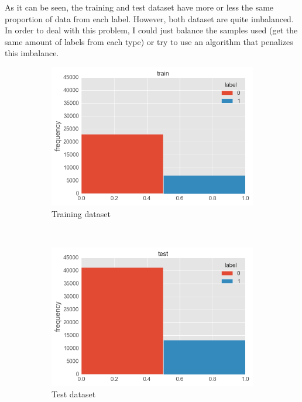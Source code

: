 \documentclass[]{article}
\begin{document}
As it can be seen, the training and test dataset have more or less the same proportion of data from each label. However, both dataset are quite imbalanced. In order to deal with this problem, I could just balance the samples used (get the same amount of labels from each type) or try to use an algorithm that penalizes this imbalance.


\begin{figure}[htpb!]
	\centering
    \begin{subfigure}[r]{0.5\textwidth}
		\centering
		\includegraphics[width=\linewidth]{./images/2_dataset}
		\caption{Training dataset \label{img:train_dataset}}
				 
    \end{subfigure}%
    ~
    \begin{subfigure}[l]{0.5\textwidth}
		\centering
		\includegraphics[width=\linewidth]{./images/2_dataset_test}
		\caption{Test dataset\label{img:test_dataset}}
    \end{subfigure}%
    \caption{\label{img:dataset}}
   
\end{figure} 
\end{document}
